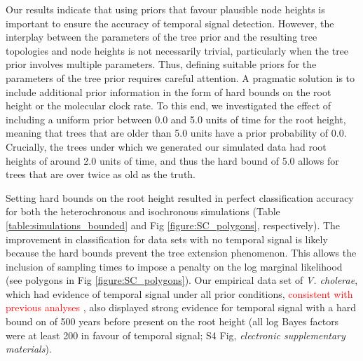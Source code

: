\documentclass[10pt,letterpaper]{article}
\begin{document}
Our results indicate that using priors that favour plausible node heights is important to ensure the accuracy of temporal signal detection. However, the interplay between the parameters of the tree prior and the resulting tree topologies and node heights is not necessarily trivial, particularly when the tree prior involves multiple parameters. Thus, defining suitable priors for the parameters of the tree prior requires careful attention. A pragmatic solution is to include additional prior information in the form of hard bounds on the root height or the molecular clock rate. To this end, we investigated the effect of including a uniform prior between 0.0 and 5.0 units of time for the root height, meaning that trees that are older than 5.0 units have a prior probability of 0.0. Crucially, the trees under which we generated our simulated data had root heights of around 2.0 units of time, and thus the hard bound of 5.0 allows for trees that are over twice as old as the truth. 

Setting hard bounds on the root height resulted in perfect classification accuracy for both the heterochronous and isochronous simulations (Table \ref{table:simulations_bounded} and Fig \ref{figure:SC_polygons}, respectively). The improvement in classification for data sets with no temporal signal is likely because the hard bounds prevent the tree extension phenomenon. This allows the inclusion of sampling times to impose a penalty on the log marginal likelihood (see polygons in Fig \ref{figure:SC_polygons}). Our empirical data set of \textit{V. cholerae}, which had evidence of temporal signal under all prior conditions, \textcolor{red}{consistent with previous analyses \cite{devault2014second}}, also displayed strong evidence for temporal signal with a hard bound on of 500 years before present on the root height (all log Bayes factors were at least 200 in favour of temporal signal; S4 Fig, \textit{electronic supplementary materials}).
\end{document}
